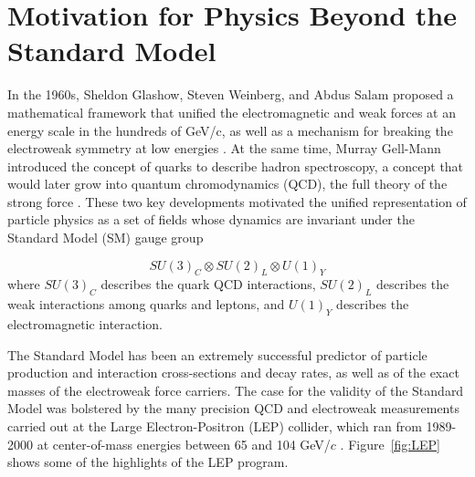 \documentclass[dissertation.tex]{subfiles}
\begin{document}
\chapter{Motivation for Physics Beyond the Standard Model}
\label{chap:Motivation for Physics Beyond the Standard Model}

In the 1960s, Sheldon Glashow, Steven Weinberg, and Abdus Salam proposed a mathematical framework that unified the electromagnetic and weak forces at an energy scale in the hundreds of GeV/c, as well as a mechanism for breaking the electroweak symmetry at low energies \cite{Glashow1961579,PhysRevD.2.1285,PhysRev.127.965,PhysRevLett.19.1264,Salam1964168}.  At the same time, Murray Gell-Mann introduced the concept of quarks to describe hadron spectroscopy, a concept that would later grow into quantum chromodynamics (QCD), the full theory of the strong force \cite{GellMann1964214,Lichtenberg:784713}.  These two key developments motivated the unified representation of particle physics as a set of fields whose dynamics are invariant under the Standard Model (SM) gauge group

\begin{equation}
SU(3)_{C} \otimes SU(2)_{L} \otimes U(1)_{Y}
\end{equation}
%
where $SU(3)_{C}$ describes the quark QCD interactions, $SU(2)_{L}$ describes the weak interactions among quarks and leptons, and $U(1)_{Y}$ describes the electromagnetic interaction.

The Standard Model has been an extremely successful predictor of particle production and interaction cross-sections and decay rates, as well as of the exact masses of the electroweak force carriers.  The case for the validity of the Standard Model was bolstered by the many precision QCD and electroweak measurements carried out at the Large Electron-Positron (LEP) collider, which ran from 1989-2000 at center-of-mass energies between 65 and 104 GeV/$c$ \cite{Drees}.  Figure~\ref{fig:LEP} shows some of the highlights of the LEP program.
\end{document}

